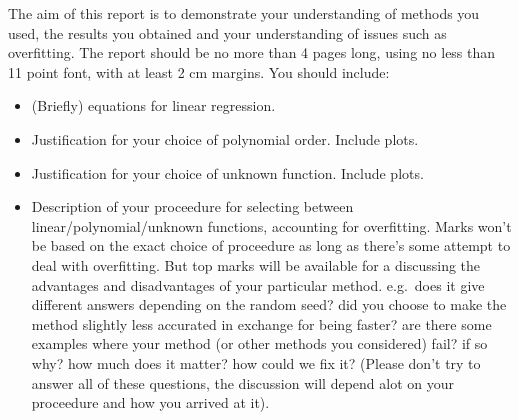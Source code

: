 \documentclass[10pt]{article}
\begin{document}
The aim of this report is to demonstrate your understanding of methods you used, the results you obtained and your understanding of issues such as overfitting.
The report should be no more than 4 pages long, using no less than 11 point font, with at least 2 cm margins.
You should include:
\begin{itemize}
  \item (Briefly) equations for linear regression.
  \item Justification for your choice of polynomial order.  Include plots.
  \item Justification for your choice of unknown function.  Include plots.
  \item Description of your proceedure for selecting between linear/polynomial/unknown functions, accounting for overfitting.  Marks won't be based on the exact choice of proceedure as long as there's some attempt to deal with overfitting.  But top marks will be available for a discussing the advantages and disadvantages of your particular method.  e.g.\ does it give different answers depending on the random seed?  did you choose to make the method slightly less accurated in exchange for being faster? are there some examples where your method (or other methods you considered) fail? if so why? how much does it matter? how could we fix it?  (Please don't try to answer all of these questions, the discussion will depend alot on your proceedure and how you arrived at it).
\end{itemize}
\end{document}

